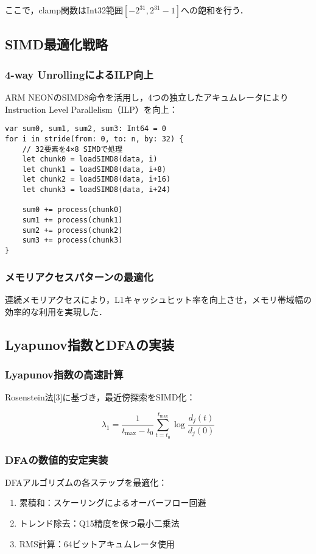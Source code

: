 \documentclass[10pt,twocolumn]{article}
\begin{document}
\begin{CJK}{UTF8}{min}
ここで，clamp関数はInt32範囲$[-2^{31}, 2^{31}-1]$への飽和を行う．

\subsection{SIMD最適化戦略}

\subsubsection{4-way UnrollingによるILP向上}
ARM NEONのSIMD8命令を活用し，4つの独立したアキュムレータによりInstruction Level Parallelism（ILP）を向上：

\begin{lstlisting}[caption=4-way unrollingの実装]
var sum0, sum1, sum2, sum3: Int64 = 0
for i in stride(from: 0, to: n, by: 32) {
    // 32要素を4×8 SIMDで処理
    let chunk0 = loadSIMD8(data, i)
    let chunk1 = loadSIMD8(data, i+8)
    let chunk2 = loadSIMD8(data, i+16)
    let chunk3 = loadSIMD8(data, i+24)
    
    sum0 += process(chunk0)
    sum1 += process(chunk1)
    sum2 += process(chunk2)
    sum3 += process(chunk3)
}
\end{lstlisting}

\subsubsection{メモリアクセスパターンの最適化}
連続メモリアクセスにより，L1キャッシュヒット率を向上させ，メモリ帯域幅の効率的な利用を実現した．

\subsection{Lyapunov指数とDFAの実装}

\subsubsection{Lyapunov指数の高速計算}
Rosenstein法[3]に基づき，最近傍探索をSIMD化：

\begin{equation}
\lambda_1 = \frac{1}{t_{\max} - t_0} \sum_{t=t_0}^{t_{\max}} \log \frac{d_j(t)}{d_j(0)}
\end{equation}

\subsubsection{DFAの数値的安定実装}
DFAアルゴリズムの各ステップを最適化：
\begin{enumerate}
\item 累積和：スケーリングによるオーバーフロー回避
\item トレンド除去：Q15精度を保つ最小二乗法
\item RMS計算：64ビットアキュムレータ使用
\end{enumerate}


\end{CJK}
\end{document}
